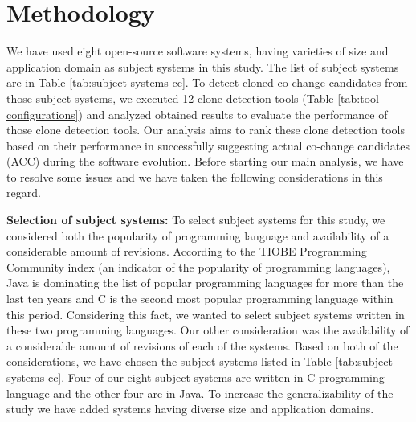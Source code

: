 \documentclass[review]{elsarticle}
\begin{document}
\section{Methodology}
\label{the-methodology}
We have used eight open-source software systems, having varieties of size and application domain as subject systems in this study. The list of subject systems are in Table \ref{tab:subject-systems-cc}. To detect cloned co-change candidates from those subject systems, we executed 12 clone detection tools (Table \ref{tab:tool-configurations}) and analyzed obtained results to evaluate the performance of those clone detection tools. Our analysis aims to rank these clone detection tools based on their performance in successfully suggesting actual co-change candidates (ACC) during the software evolution. Before starting our main analysis, we have to resolve some issues and we have taken the following considerations in this regard. 

\vspace{1mm}
\textbf{Selection of subject systems:} To select subject systems for this study, we considered both the popularity of programming language and availability of a considerable amount of revisions. According to the TIOBE Programming Community index \cite{TIOBE2019} (an indicator of the popularity of programming languages), Java is dominating the list of popular programming languages for more than the last ten years and C is the second most popular programming language within this period. Considering this fact, we wanted to select subject systems written in these two programming languages. Our other consideration was the availability of a considerable amount of revisions of each of the systems. Based on both of the considerations, we have chosen the subject systems listed in Table \ref{tab:subject-systems-cc}. Four of our eight subject systems are written in C programming language and the other four are in Java.  To increase the generalizability of the study we have added systems having diverse size and application domains.
\end{document}
